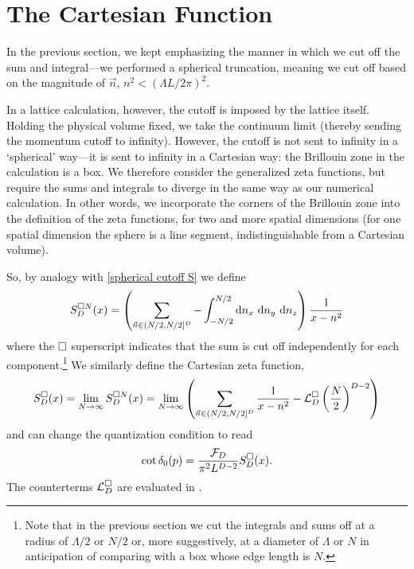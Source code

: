 \section{The Cartesian Function}\label{sec:cartesian}

In the previous section, we kept emphasizing the manner in which we cut off the sum and integral---we performed a spherical truncation, meaning we cut off based on the magnitude of $\vec{n}$, $n^2 < (\Lambda L/2\pi)^2$.

In a lattice calculation, however, the cutoff is imposed by the lattice itself.
Holding the physical volume fixed, we take the continuum limit (thereby sending the momentum cutoff to infinity).
However, the cutoff is not sent to infinity in a `spherical' way---it is sent to infinity in a Cartesian way: the Brillouin zone in the calculation is a box.
We therefore consider the generalized zeta functions, but require the sums and integrals to diverge in the same way as our numerical calculation.
In other words, we incorporate the corners of the Brillouin zone into the definition of the zeta functions, for two and more spatial dimensions (for one spatial dimension the sphere is a line segment, indistinguishable from a Cartesian volume).

So, by analogy with \eqref{spherical cutoff S} we define
\begin{equation}
        S^{\cartesian N}_D(x)
        = \left(
            \sum_{\vec{n} \in (N/2, N/2]^D}
            -
            \int_{-N/2}^{N/2} \mathrm{d}n_x\ \mathrm{d}n_y\ \mathrm{d}n_z
        \right) \frac{1}{x-n^2}
\end{equation}
where the $\square$ superscript indicates that the sum is cut off independently for each component.\footnote{Note that in the previous section we cut the integrals and sums off at a radius of $\Lambda/2$ or $N/2$ or, more suggestively, at a diameter of $\Lambda$ or $N$ in anticipation of comparing with a box whose edge length is $N$.}
We similarly define the Cartesian zeta function,
\begin{equation}\label{eq:S cartesian}
    S^{\square}_D(x)
    =
    \lim_{N\rightarrow\infty} S^{\square N}_D(x)
    =
    \lim_{N\rightarrow\infty}\left( \sum_{\vec{n} \in (N/2, N/2]^D} \frac{1}{x-n^2} - \mathcal{L}_D^\square \left(\frac{N}{2}\right)^{D-2}\right)
\end{equation}
and can change the quantization condition to read
\begin{equation}\label{eq:cartesian quantization}
    \cot \delta_0(p) = \frac{\mathcal{F}_D}{\pi^2 L^{D-2}} S^\square_D(x).
\end{equation}
The counterterms $\mathcal{L}_D^\square$ are evaluated in .

